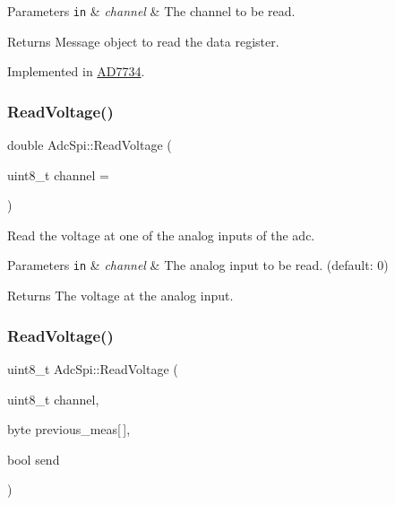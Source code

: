 \begin{DoxyParams}[1]{Parameters}
\mbox{\tt in}  & {\em channel} & The channel to be read. \\
\hline
\end{DoxyParams}
\begin{DoxyReturn}{Returns}
Message object to read the data register. 
\end{DoxyReturn}


Implemented in \mbox{\hyperlink{classAD7734_a6fa5e7c2bd8cde50dccb328d36f12516}{A\+D7734}}.

\mbox{\label{classAdcSpi_ace8264acfedb357986afa5f611eff3ee}} 
\subsubsection{\texorpdfstring{Read\+Voltage()}{ReadVoltage()}\hspace{0.1cm}{\footnotesize\ttfamily [1/2]}}
{\footnotesize\ttfamily double Adc\+Spi\+::\+Read\+Voltage (\begin{DoxyParamCaption}\item[{uint8\+\_\+t}]{channel = {} }\end{DoxyParamCaption})}

Read the voltage at one of the analog inputs of the adc. 
\begin{DoxyParams}[1]{Parameters}
\mbox{\tt in}  & {\em channel} & The analog input to be read. (default\+: 0) \\
\hline
\end{DoxyParams}
\begin{DoxyReturn}{Returns}
The voltage at the analog input. 
\end{DoxyReturn}
\mbox{\label{classAdcSpi_ac9d2ab924ad4de5b91713a22189f2ad0}} 
\subsubsection{\texorpdfstring{Read\+Voltage()}{ReadVoltage()}\hspace{0.1cm}{\footnotesize\ttfamily [2/2]}}
{\footnotesize\ttfamily uint8\+\_\+t Adc\+Spi\+::\+Read\+Voltage (\begin{DoxyParamCaption}\item[{uint8\+\_\+t}]{channel,  }\item[{byte}]{previous\+\_\+meas\mbox{[}$\,$\mbox{]},  }\item[{bool}]{send }\end{DoxyParamCaption})}

